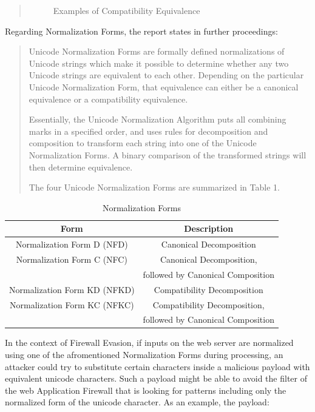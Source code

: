 \begin{quote}
\begin{figure}[!h]
		\label{fig:compeq}
		\caption{ Examples of Compatibility Equivalence \cite{unicode/normalization}}
	\end{figure}
\end{quote}

Regarding Normalization Forms, the report states in further proceedings:
\begin{quote}
	Unicode Normalization Forms are formally defined normalizations of Unicode strings which make it possible to determine whether any two Unicode strings are equivalent to each other. Depending on the particular Unicode Normalization Form, that equivalence can either be a canonical equivalence or a compatibility equivalence.

	Essentially, the Unicode Normalization Algorithm puts all combining marks in a specified order, and uses rules for decomposition and composition to transform each string into one of the Unicode Normalization Forms. A binary comparison of the transformed strings will then determine equivalence.

	The four Unicode Normalization Forms are summarized in Table 1. \cite{unicode/normalization}
\end{quote}
\begin{table}
	\centering
	\label{tab:normform}
	\caption{ Normalization Forms }
	\begin{tabular}{ |c|c| }
		\hline
		Form                         & Description                       \\
		\hline
		\hline
		Normalization Form D (NFD)   & Canonical Decomposition           \\
		\hline
		Normalization Form C (NFC)   & Canonical Decomposition,          \\
		                             & followed by Canonical Composition \\
		\hline
		Normalization Form KD (NFKD) & Compatibility Decomposition       \\
		Normalization Form KC (NFKC) & Compatibility Decomposition,      \\
		                             & followed by Canonical Composition \\
		\hline
	\end{tabular}
\end{table}
In the context of Firewall Evasion, if inputs on the web server are normalized using one of the afromentioned Normalization Forms during processing, an attacker could try to substitute certain characters inside a malicious payload with equivalent unicode characters. \cite{medium/allypetitt}
Such a payload might be able to avoid the filter of the web Application Firewall that is looking for patterns including only the normalized form of the unicode character. As an example, the payload:

